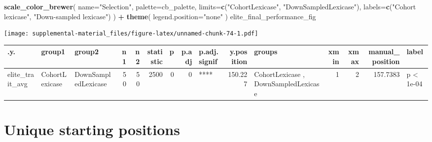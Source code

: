 \documentclass[]{book}
\newenvironment{Shaded}{\begin{snugshade}}{\end{snugshade}}
\newcommand{\DataTypeTok}[1]{\textcolor[rgb]{0.13,0.29,0.53}{#1}}
\newcommand{\KeywordTok}[1]{\textcolor[rgb]{0.13,0.29,0.53}{\textbf{#1}}}
\newcommand{\NormalTok}[1]{#1}
\newcommand{\OperatorTok}[1]{\textcolor[rgb]{0.81,0.36,0.00}{\textbf{#1}}}
\newcommand{\StringTok}[1]{\textcolor[rgb]{0.31,0.60,0.02}{#1}}
\begin{document}
\begin{Shaded}
\begin{Highlighting}[]
\StringTok{  }\KeywordTok{scale_color_brewer}\NormalTok{(}
    \DataTypeTok{name=}\StringTok{"Selection"}\NormalTok{,}
    \DataTypeTok{palette=}\NormalTok{cb_palette,}
    \DataTypeTok{limits=}\KeywordTok{c}\NormalTok{(}\StringTok{"CohortLexicase"}\NormalTok{, }\StringTok{"DownSampledLexicase"}\NormalTok{),}
    \DataTypeTok{labels=}\KeywordTok{c}\NormalTok{(}\StringTok{"Cohort lexicase"}\NormalTok{, }\StringTok{"Down-sampled lexicase"}\NormalTok{)}
\NormalTok{  ) }\OperatorTok{+}
\StringTok{  }\KeywordTok{theme}\NormalTok{(}
    \DataTypeTok{legend.position=}\StringTok{"none"}
\NormalTok{  )}
\NormalTok{elite_final_performance_fig}
\end{Highlighting}
\end{Shaded}

\texttt{[image: supplemental-material\_files/figure-latex/unnamed-chunk-74-1.pdf]}

\begin{tabular}{l|l|l|r|r|r|r|r|l|r|l|r|r|r|l}
\hline
.y. & group1 & group2 & n1 & n2 & statistic & p & p.adj & p.adj.signif & y.position & groups & xmin & xmax & manual\_position & label\\
\hline
elite\_trait\_avg & CohortLexicase & DownSampledLexicase & 50 & 50 & 2500 & 0 & 0 & **** & 150.227 & CohortLexicase     , DownSampledLexicase & 1 & 2 & 157.7383 & p < 1e-04\\
\hline
\end{tabular}

\hypertarget{unique-starting-positions-6}{%
\section{Unique starting positions}\label{unique-starting-positions-6}}
\end{document}
